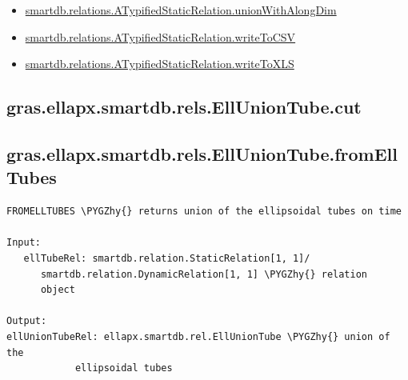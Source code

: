\documentclass[letterpaper,10pt,english]{sphinxmanual}
\def\PYGZhy{\char`\-}
\begin{document}
\begin{itemize}
\item {} 
{\hyperref[chap_functions:smartdb-relations-atypifiedstaticrelation-unionwithalongdim]{smartdb.relations.ATypifiedStaticRelation.unionWithAlongDim}}

\item {} 
{\hyperref[chap_functions:smartdb-relations-atypifiedstaticrelation-writetocsv]{smartdb.relations.ATypifiedStaticRelation.writeToCSV}}

\item {} 
{\hyperref[chap_functions:smartdb-relations-atypifiedstaticrelation-writetoxls]{smartdb.relations.ATypifiedStaticRelation.writeToXLS}}

\end{itemize}


\subsection{gras.ellapx.smartdb.rels.EllUnionTube.cut}
\label{chap_functions:gras-ellapx-smartdb-rels-elluniontube-cut}

\subsection{gras.ellapx.smartdb.rels.EllUnionTube.fromEllTubes}
\label{chap_functions:gras-ellapx-smartdb-rels-elluniontube-fromelltubes}
\begin{Verbatim}[commandchars=\\\{\}]
FROMELLTUBES \PYGZhy{} returns union of the ellipsoidal tubes on time

Input:
   ellTubeRel: smartdb.relation.StaticRelation[1, 1]/
      smartdb.relation.DynamicRelation[1, 1] \PYGZhy{} relation
      object

Output:
ellUnionTubeRel: ellapx.smartdb.rel.EllUnionTube \PYGZhy{} union of the
            ellipsoidal tubes
\end{Verbatim}
\end{document}
